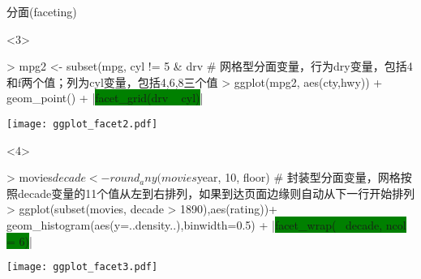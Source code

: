\begin{frame}[t,fragile]{\subsecname}{分面(faceting)}
\begin{overlayarea}{\textwidth}{\textheight}
\begin{onlyenv}<3>
\begin{minipage}{\textwidth}
\begin{rcode}
> mpg2 <- subset(mpg, cyl != 5 & drv %
# 网格型分面变量，行为dry变量，包括4和f两个值；列为cyl变量，包括4,6,8三个值
> ggplot(mpg2, aes(cty,hwy)) + geom_point() + |\colorbox{green}{facet\_grid(drv ~ cyl)}|
\end{rcode}
\end{minipage}
\begin{minipage}{\textwidth}
\centering
\texttt{[image: ggplot\_facet2.pdf]}
\end{minipage}
\end{onlyenv}

\begin{onlyenv}<4>
\begin{minipage}{\textwidth}
\begin{rcode}
> movies$decade <- round_any(movies$year, 10, floor)
# 封装型分面变量，网格按照decade变量的11个值从左到右排列，如果到达页面边缘则自动从下一行开始排列
> ggplot(subset(movies, decade > 1890),aes(rating))+
     geom_histogram(aes(y=..density..),binwidth=0.5) + 
     |\colorbox{green}{facet\_wrap(~ decade, ncol = 6)}|
\end{rcode}
\end{minipage}
\begin{minipage}{\textwidth}
\centering
\texttt{[image: ggplot\_facet3.pdf]}
\end{minipage}
\end{onlyenv}



\end{overlayarea}
\end{frame}

